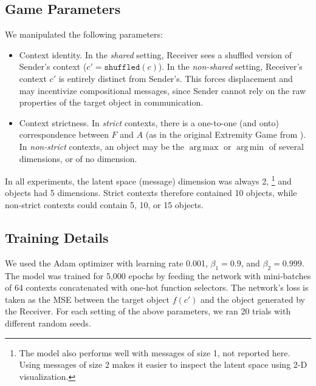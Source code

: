 \documentclass[11pt,a4paper]{article}
\DeclareMathOperator*{\argmax}{arg\,max}
\DeclareMathOperator*{\argmin}{arg\,min}
\newcommand{\changeEC}[2]{{\leavevmode\color{gray}{\scriptsize{#1}}~\color{blue}#2}}
\newcommand{\nbEC}[1]{{\leavevmode\color{blue}{\scriptsize#1}}}
\begin{document}
\subsection{Game Parameters}

We manipulated the following parameters:
\begin{itemize}[noitemsep]
	\item Context identity. 
	In the \emph{shared} setting, Receiver sees a shuffled version of Sender's context ($c' = \texttt{shuffled}(c)$). In the \emph{non-shared} setting, Receiver's context $c'$ is entirely distinct from Sender's. This forces displacement and may incentivize compositional messages, since Sender cannot rely on the raw properties of the target object in communication.

	\item Context strictness. 
	In \emph{strict} contexts, there is a one-to-one (and onto) correspondence between $F$ and $A$ (as in the original Extremity Game from \citealp{Steinert-Threlkeld2019}). 
In \emph{non-strict} contexts, an object may be the $\argmax$ or $\argmin$ of several dimensions, or of no dimension.

\end{itemize}
In all experiments, the latent space (message) dimension was always 2,%
\footnote{The model also performs well with messages of size 1, not reported here. Using messages of size 2 makes it easier to inspect the latent space using 2-D visualization.}
and objects had 5 dimensions. Strict contexts therefore contained 10 objects, while non-strict contexts could contain 5, 10, or 15 objects.

\subsection{Training Details}

We used the Adam optimizer \citep{Kingma2015} with learning rate 0.001, $\beta_1 = 0.9$, and $\beta_2 = 0.999$. The model was trained for 5,000 epochs by feeding the network with mini-batches of 64 contexts concatenated with one-hot function selectors. The network's loss is taken as the MSE between the target object $f(c')$ and the object generated by the Receiver. For each setting of the above parameters, we ran 20 trials with different random seeds.
\end{document}
